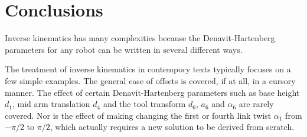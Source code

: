 \documentclass[11pt]{article}
\numberwithin{equation}{section}
\begin{document}
\section{Conclusions}
Inverse kinematics has many complexities because the Denavit-Hartenberg parameters for any robot can be written in several
different ways.

The treatment of inverse kinematics in contempory texts\cite{Paul81a}\cite{Spong06}\cite{siciliano08}\cite{Jazar10} typically focuses on a
few simple examples.  The general case of offsets is covered, if at all, in a cursory manner.  The effect of certain Denavit-Hartenberg parameters
such as base height $d_1$, mid arm translation $d_4$ and the tool transform $d_6$, $a_6$ and $\alpha_6$ are rarely covered.
Nor is the effect of making changing the first or fourth link twist $\alpha_1$ from $-\pi/2$ to $\pi/2$, which actually requires a new solution to be
derived from scratch.



\end{document}
